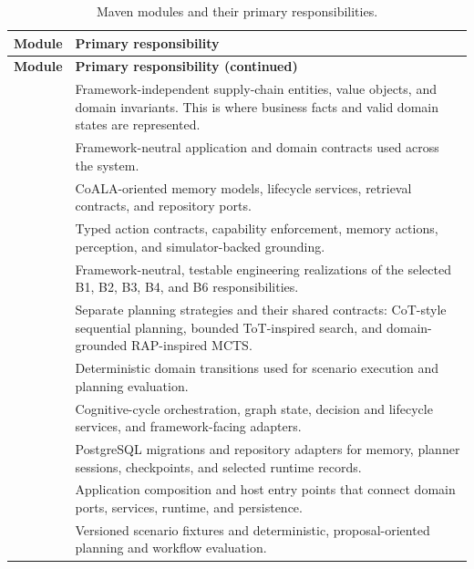 \begin{longtable}{P{0.26\textwidth} P{0.62\textwidth}}
\caption{Maven modules and their primary responsibilities.}\label{tab:appendix-a-modules}\\
\toprule
\textbf{Module} & \textbf{Primary responsibility} \\
\midrule
\endfirsthead
\toprule
\textbf{Module} & \textbf{Primary responsibility (continued)} \\
\midrule
\endhead
{} & Framework-independent supply-chain entities, value objects, and domain invariants. This is where business facts and valid domain states are represented. \\
 & Framework-neutral application and domain contracts used across the system. \\
 & CoALA-oriented memory models, lifecycle services, retrieval contracts, and repository ports. \\
 & Typed action contracts, capability enforcement, memory actions, perception, and simulator-backed grounding. \\
 & Framework-neutral, testable engineering realizations of the selected B1, B2, B3, B4, and B6 responsibilities. \\
 & Separate planning strategies and their shared contracts: CoT-style sequential planning, bounded ToT-inspired search, and domain-grounded RAP-inspired MCTS. \\
 & Deterministic domain transitions used for scenario execution and planning evaluation. \\
 & Cognitive-cycle orchestration, graph state, decision and lifecycle services, and framework-facing adapters. \\
 & PostgreSQL migrations and repository adapters for memory, planner sessions, checkpoints, and selected runtime records. \\
 & Application composition and host entry points that connect domain ports, services, runtime, and persistence. \\
 & Versioned scenario fixtures and deterministic, proposal-oriented planning and workflow evaluation. \\
\bottomrule
\end{longtable}

